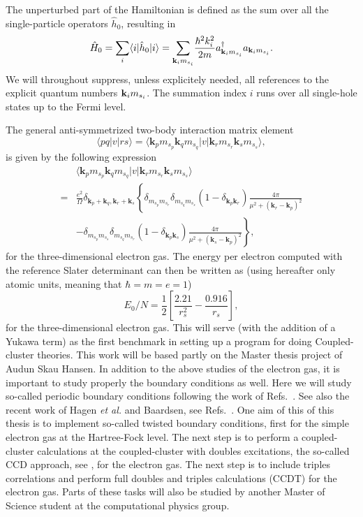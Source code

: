 \documentclass[aps,prc,twocolumn,showpacs,floatfix,nofootinbib,preprintnumbers,superscriptaddress,amsmath,amssymb]{revtex4-1}
\begin{document}
The unperturbed part
of the Hamiltonian is defined as the sum over all the single-particle
operators $\hat{h}_0$, resulting in
\[
\hat{H}_{0}=\sum_i\langle i|\hat{h}_0|i \rangle= {\displaystyle\sum_{{\bf k}_{i}m_{s_i}}}
\frac{\hbar^{2}k_i^{2}}{2m}a_{{\bf k}_{i}m_{s_i}}^{\dagger}
a_{{\bf k}_{i}m_{s_i}}.
\]
We will throughout suppress, unless explicitely needed, all references
to the explicit quantum numbers ${\bf k}_{i}m_{s_i}$. The summation
index $i$ runs over all single-hole states up to the Fermi level.

The general anti-symmetrized two-body interaction matrix element 
\[
\langle pq |v| r s \rangle = \langle
\mathbf{k}_{p}m_{s_{p}}\mathbf{k}_{q}m_{s_{q}}|v|\mathbf{k}_{r}m_{s_{r}}\mathbf{k}_{s}m_{s_{s}}\rangle,
\]
is given by the following expression
  \begin{align}
    & \langle
    \mathbf{k}_{p}m_{s_{p}}\mathbf{k}_{q}m_{s_{q}}|v|\mathbf{k}_{r}m_{s_{r}}\mathbf{k}_{s}m_{s_{s}}\rangle
    \nonumber \\ =&
    \frac{e^{2}}{\Omega}\delta_{\mathbf{k}_{p}+\mathbf{k}_{q},
      \mathbf{k}_{r}+\mathbf{k}_{s}}\left\{
    \delta_{m_{s_{p}}m_{s_{r}}}\delta_{m_{s_{q}}m_{s_{s}}}(1-\delta_{\mathbf{k}_{p}\mathbf{k}_{r}})\frac{4\pi
    }{\mu^{2} + (\mathbf{k}_{r}-\mathbf{k}_{p})^{2}} \right. \nonumber
    \\ & \left. -
    \delta_{m_{s_{p}}m_{s_{s}}}\delta_{m_{s_{q}}m_{s_{r}}}(1-\delta_{\mathbf{k}_{p}\mathbf{k}_{s}})\frac{4\pi
    }{\mu^{2} + (\mathbf{k}_{s}-\mathbf{k}_{p})^{2}} \right\},
    \nonumber
  \end{align}
for the three-dimensional electron gas.  The energy per electron computed with
the reference Slater determinant can then be written as 
(using hereafter only atomic units, meaning that $\hbar = m = e = 1$)
\[
E_0/N=\frac{1}{2}\left[\frac{2.21}{r_s^2}-\frac{0.916}{r_s}\right],
\]
for the three-dimensional electron gas.  This will serve (with the
addition of a Yukawa term) as the first benchmark in setting up a
program for doing Coupled-cluster theories. This work will be based partly on the 
Master thesis project of Audun Skau Hansen.  In addition to the above studies of the electron gas, it
is important to study properly the boundary conditions as well. Here
we will study so-called periodic boundary conditions following the
work of Refs.~\cite{gros1992,gros1996,lin2001}. See also the recent
work of Hagen {\em et al.} and Baardsen, see Refs.~\cite{hagen2014,baardsen2014}. 
One aim of this 
of this thesis is to implement so-called twisted boundary conditions,
first for the simple electron gas at the Hartree-Fock level. 
The next
step is to perform a coupled-cluster calculations at the
coupled-cluster with doubles excitations, the so-called CCD approach,
see \cite{shavittbartlett2009}, for the electron gas.  The next step
is to include triples correlations and perform full doubles and
triples calculations (CCDT) for the electron gas. 
Parts of these tasks will also be studied by another Master of Science student at the 
computational physics group.
\end{document}
